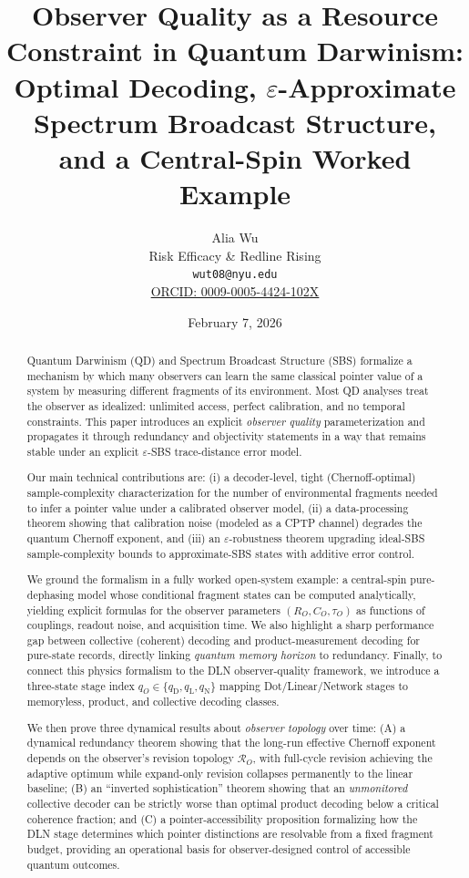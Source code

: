 \documentclass[11pt]{article}
\title{\bf Observer Quality as a Resource Constraint in Quantum Darwinism:\\
Optimal Decoding, $\varepsilon$-Approximate Spectrum Broadcast Structure,\\
and a Central-Spin Worked Example}
\author{
Alia Wu\\
Risk Efficacy \& Redline Rising\\
\texttt{wut08@nyu.edu}\\
\href{https://orcid.org/0009-0005-4424-102X}{ORCID: 0009-0005-4424-102X}
}
\date{February 7, 2026}
\newcommand{\cR}{\mathcal{R}}
\newcommand{\1}{\mathbf{1}}
\theoremstyle{definition}
\theoremstyle{plain}
\begin{document}
\maketitle

\begin{abstract}
Quantum Darwinism (QD) and Spectrum Broadcast Structure (SBS) formalize a mechanism by which many observers can learn the same classical pointer value of a system by measuring different fragments of its environment.
Most QD analyses treat the observer as idealized: unlimited access, perfect calibration, and no temporal constraints.
This paper introduces an explicit \emph{observer quality} parameterization and propagates it through redundancy and objectivity statements in a way that remains stable under an explicit $\varepsilon$-SBS trace-distance error model.

Our main technical contributions are:
(i) a decoder-level, tight (Chernoff-optimal) sample-complexity characterization for the number of environmental fragments needed to infer a pointer value under a calibrated observer model,
(ii) a data-processing theorem showing that calibration noise (modeled as a CPTP channel) degrades the quantum Chernoff exponent, and
(iii) an $\varepsilon$-robustness theorem upgrading ideal-SBS sample-complexity bounds to approximate-SBS states with additive error control.

We ground the formalism in a fully worked open-system example: a central-spin pure-dephasing model whose conditional fragment states can be computed analytically, yielding explicit formulas for the observer parameters $(R_O,C_O,\tau_O)$ as functions of couplings, readout noise, and acquisition time.
We also highlight a sharp performance gap between collective (coherent) decoding and product-measurement decoding for pure-state records, directly linking \emph{quantum memory horizon} to redundancy.
Finally, to connect this physics formalism to the DLN observer-quality framework, we introduce a three-state stage index $q_O\in\{q_{\mathrm{D}},q_{\mathrm{L}},q_{\mathrm{N}}\}$ mapping Dot/Linear/Network stages to memoryless, product, and collective decoding classes.

We then prove three dynamical results about \emph{observer topology} over time: (A) a dynamical redundancy theorem showing that the long-run effective Chernoff exponent depends on the observer's revision topology $\cR_O$, with full-cycle revision achieving the adaptive optimum while expand-only revision collapses permanently to the linear baseline; (B) an ``inverted sophistication'' theorem showing that an \emph{unmonitored} collective decoder can be strictly worse than optimal product decoding below a critical coherence fraction; and (C) a pointer-accessibility proposition formalizing how the DLN stage determines which pointer distinctions are resolvable from a fixed fragment budget, providing an operational basis for observer-designed control of accessible quantum outcomes.
\end{abstract}
\end{document}
